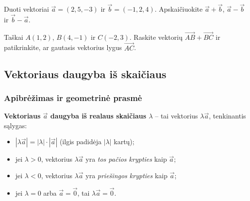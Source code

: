 \begin{exercise}
Duoti vektoriai $\vec{a} = (2, 5, -3)$ ir $\vec{b} = (-1, 2, 4)$.
Apskaičiuokite $\vec{a} + \vec{b}$, $\vec{a} - \vec{b}$ ir $\vec{b} - \vec{a}$.
\end{exercise}

\begin{exercise}
Taškai $A(1, 2)$, $B(4, -1)$ ir $C(-2, 3)$.
Raskite vektorių $\overrightarrow{AB} + \overrightarrow{BC}$ ir patikrinkite,
ar gautasis vektorius lygus $\overrightarrow{AC}$.
\end{exercise}

\subsection{Vektoriaus daugyba iš skaičiaus}

\subsubsection*{Apibrėžimas ir geometrinė prasmė}

\begin{definition}
\textbf{Vektoriaus $\vec{a}$ daugyba iš realaus skaičiaus $\lambda$} – tai vektorius
$\lambda\vec{a}$, tenkinantis sąlygas:
\begin{itemize}
  \item $|\lambda\vec{a}| = |\lambda| \cdot |\vec{a}|$ \quad (ilgis padidėja $|\lambda|$ kartų);
  \item jei $\lambda > 0$, vektorius $\lambda\vec{a}$ yra \emph{tos pačios krypties} kaip $\vec{a}$;
  \item jei $\lambda < 0$, vektorius $\lambda\vec{a}$ yra \emph{priešingos krypties} kaip $\vec{a}$;
  \item jei $\lambda = 0$ arba $\vec{a} = \vec{0}$, tai $\lambda\vec{a} = \vec{0}$.
\end{itemize}
\end{definition}

\begin{center}
\end{center}

